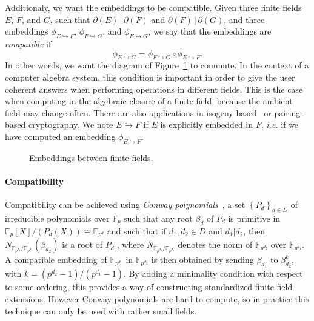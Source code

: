 \documentclass[12pt]{article}
\newcommand{\dE}{\partial(E)}
\newcommand{\dF}{\partial(F)}
\newcommand{\dG}{\partial(G)}
\newcommand{\emb}{\hookrightarrow}
\newcommand{\embed}[2]{\phi_{#1\hookrightarrow#2}}
\newcommand{\ie}{\emph{i.e. }}
\begin{document}
Additionaly, we want the embeddings to be compatible. Given three finite 
fields $E$, $F$, and $G$, such that $\dE\,|\,\dF$ and $\dF\,|\,\dG$, and three 
embeddings $\embed{E}{F}$, $\embed{F}{G}$, and $\embed{E}{G}$, we say that the
embeddings are \emph{compatible} if 
\[
  \embed{E}{G}=\embed{F}{G}\circ\embed{E}{F}.
\]
In other words, we want the diagram of Figure~\ref{fig:compatibility} to
commute. In the context of a computer algebra system, this condition is
important in order to give the user coherent answers when performing operations
in different fields. This is the case when computing in the algebraic closure of a
finite field, because the ambient field may change often. There are also
applications in isogeny-based~\cite{Defeo17} or pairing-based cryptography.
We note $E\emb F$ if $E$ is explicitly embedded in $F$, \ie if
we have computed an embedding $\embed{E}{F}$.
\begin{figure}
  \centering

  \caption{Embeddings between finite fields.}
  \label{fig:compatibility}
\end{figure}

\paragraph{Compatibility}

Compatibility can be achieved using \emph{Conway polynomials}~\cite{Parker90, HL98}, a set $\left\{
P_d \right\}_{d\in D}$ of
irreducible polynomials over $\mathbb{F}_p$ such that any root $\beta_d$ of
$P_d$ is primitive in $\mathbb{F}_{p}[X]/(P_d(X))\cong \mathbb{F}_{p^d}$ and
such that if $d_1, d_2\in D$ and $d_1|d_2$, then
$N_{\mathbb{F}_{p^{d_2}}/\mathbb{F}_{p^{d_1}}}(\beta_{d_2})$ is a root of
$P_{d_1}$, where $N_{\mathbb{F}_{p^{d_2}}/\mathbb{F}_{p^{d_1}}}$ denotes
the norm of $\mathbb{F}_{p^{d_2}}$ over $\mathbb{F}_{p^{d_1}}$. A compatible
embedding of $\mathbb{F}_{p^{d_1}}$ in $\mathbb{F}_{p^{d_2}}$ is then obtained
by sending $\beta_{d_1}$ to $\beta_{d_2}^k$, with $k=(p^{d_2}-1)/(p^{d_1}-1)$.
By adding a minimality condition with respect to some ordering, this provides a
way of constructing standardized finite field extensions. However Conway polynomials
are hard to compute, so in practice this technique can only be used with rather
small fields.
\end{document}
